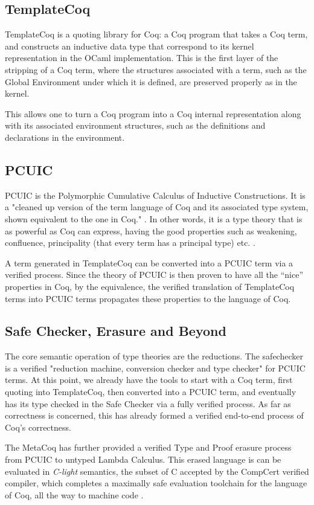 \subsection{TemplateCoq}
\label{sec:mc-template}

TemplateCoq is a quoting library for Coq: a Coq program that takes a Coq term,
and constructs an inductive data type that correspond to its kernel
representation in the OCaml implementation. This is the first layer of the
stripping of a Coq term, where the structures associated with a term, such as
the Global Environment under which it is defined, are preserved properly as in
the kernel.


This allows one to turn a Coq program into a Coq internal representation along
with its associated environment structures, such as the definitions and
declarations in the environment.

\subsection{PCUIC}
\label{sec:mc-pcuic}

PCUIC is the Polymorphic Cumulative Calculus of Inductive Constructions. It is a
"cleaned up version of the term language of Coq and its associated type system,
shown equivalent to the one in Coq." .  In other words, it is a type theory that is
as powerful as Coq can express, having the good properties such as weakening,
confluence, principality (that every term has a principal type) etc.
.

A term generated in TemplateCoq can be converted into a PCUIC term via a
verified process. Since the theory of PCUIC is then proven to have all the
``nice'' properties in Coq, by the equivalence, the verified translation of
TemplateCoq terms into PCUIC terms propagates these properties to the language
of Coq.


\subsection{Safe Checker, Erasure and Beyond}
\label{sec:mc-beyond}

The core semantic operation of type theories are the reductions. The safechecker
is a verified "reduction machine, conversion checker and type checker" for PCUIC
terms. At this point, we already have the tools to start with a Coq term, first
quoting into TemplateCoq, then converted into a PCUIC term, and eventually has
its type checked in the Safe Checker via a fully verified process. As far as
correctness is concerned, this has already formed a verified end-to-end process
of Coq's correctness.

The MetaCoq has further provided a verified Type and Proof erasure process from
PCUIC to untyped Lambda Calculus. This erased language is can be evaluated in
\emph{C-light} semantics, the subset of C accepted by the CompCert verified
compiler, which completes a maximally safe evaluation toolchain for the language
of Coq, all the way to machine code .
